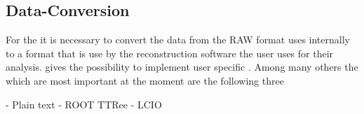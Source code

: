\subsection{Data-Conversion}
For the \offlineana it is necessary to convert the data from the RAW format \eudaq uses internally to a format that is use by the reconstruction software the user uses for their analysis. \eudaq gives the possibility to implement user specific \filewriter. Among many others the \filewriter which are most important at the moment are the following three 

- Plain text
- ROOT TTRee 
- LCIO 





